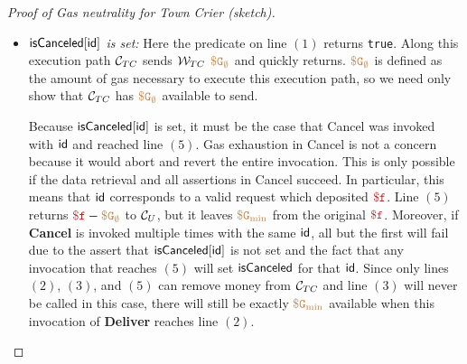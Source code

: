 \begin{proof}[Proof of Gas neutrality for Town Crier (sketch)]
\begin{itemize}
\item {\it ${\sf isCanceled}[{\sf id}]$ is set:}
Here the predicate on line $(1)$ returns {\tt true}.
Along this execution path ${\cal C}_{TC}$ sends ${\cal W}_{TC}$ $\tt {\color{brown} \$G_\emptyset }$ and quickly returns.
$\tt {\color{brown} \$G_\emptyset }$ is defined as the amount of gas necessary to execute this execution path,
so we need only show that ${\cal C}_{TC}$ has $\tt {\color{brown} \$G_\emptyset }$ available to send.

Because ${\sf isCanceled}[{\sf id}]$ is set, it must be the case that {\sf Cancel} was invoked with ${\sf id}$ and reached line $(5)$.
Gas exhaustion in {\sf Cancel} is not a concern because it would abort and revert the entire invocation.
This is only possible if the data retrieval and all assertions in {\sf Cancel} succeed.
In particular, this means that ${\sf id}$ corresponds to a valid request which deposited $\fee$.
Line $(5)$ returns $\fee - \constgascancel$ to ${\cal C}_U$, but it leaves $\tt {\color{brown} \$G_\text{min} }$ from the original $\fee$.
Moreover, if {\bf Cancel} is invoked multiple times with the same ${\sf id}$, all but the first will fail due to the assert that ${\sf isCanceled}[{\sf id}]$ is not set
and the fact that any invocation that reaches $(5)$ will set ${\sf isCanceled}$ for that ${\sf id}$.
Since only lines $(2)$, $(3)$, and $(5)$ can remove money from ${\cal C}_{TC}$ and line $(3)$ will never be called in this case,
there will still be exactly $\tt {\color{brown} \$G_\text{min} }$ available when this invocation of {\bf Deliver} reaches line $(2)$.

\end{itemize}
\end{proof}





